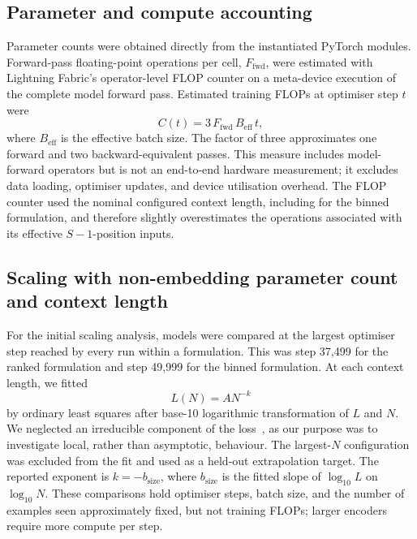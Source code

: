 \documentclass[pdflatex,sn-nature]{sn-jnl}%
\theoremstyle{thmstyleone}%
\theoremstyle{thmstyletwo}%
\theoremstyle{thmstylethree}%
\begin{document}
\subsection{Parameter and compute accounting}

Parameter counts were obtained directly from the instantiated PyTorch modules.
Forward-pass floating-point operations per cell, \(F_{\mathrm{fwd}}\), were estimated with Lightning Fabric's operator-level FLOP counter on a meta-device execution of the complete model forward pass.
Estimated training FLOPs at optimiser step \(t\) were
\begin{equation}
    C(t) = 3\,F_{\mathrm{fwd}}\,B_{\mathrm{eff}}\,t,
\end{equation}
where \(B_{\mathrm{eff}}\) is the effective batch size.
The factor of three approximates one forward and two backward-equivalent passes.
This measure includes model-forward operators but is not an end-to-end hardware measurement; it excludes data loading, optimiser updates, and device utilisation overhead.
The FLOP counter used the nominal configured context length, including for the binned formulation, and therefore slightly overestimates the operations associated with its effective \(S-1\)-position inputs.

\subsection{Scaling with non-embedding parameter count and context length}

For the initial scaling analysis, models were compared at the largest optimiser step reached by every run within a formulation.
This was step 37,499 for the ranked formulation and step 49,999 for the binned formulation.
At each context length, we fitted
\begin{equation}
    L(N)=A N^{-k}
\end{equation}
by ordinary least squares after base-10 logarithmic transformation of \(L\) and \(N\).
We neglected an irreducible component of the loss~\cite{kendiukhov2026scaling}, as our purpose was to investigate local, rather than asymptotic, behaviour.
The largest-\(N\) configuration was excluded from the fit and used as a held-out extrapolation target.
The reported exponent is \(k=-b_{\mathrm{size}}\), where \(b_{\mathrm{size}}\) is the fitted slope of \(\log_{10}L\) on \(\log_{10}N\).
These comparisons hold optimiser steps, batch size, and the number of examples seen approximately fixed, but not training FLOPs; larger encoders require more compute per step.
\end{document}
